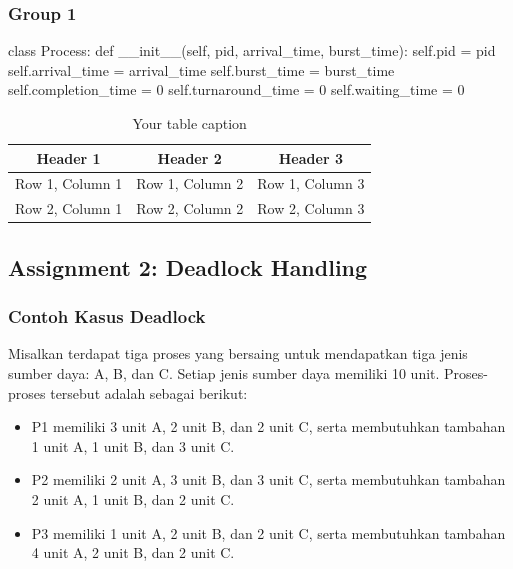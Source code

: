 \documentclass[12pt]{article}
\begin{document}
\subsubsection{Group 1}
\begin{python}
    class Process:
    def __init__(self, pid, arrival_time, burst_time):
        self.pid = pid
        self.arrival_time = arrival_time
        self.burst_time = burst_time
        self.completion_time = 0
        self.turnaround_time = 0
        self.waiting_time = 0
\end{python}

\begin{table}[htbp] %
    \centering
    \begin{tabular}{|c|c|c|} %
    \hline
    Header 1 & Header 2 & Header 3 \\ %
    \hline
    Row 1, Column 1 & Row 1, Column 2 & Row 1, Column 3 \\ %
    \hline
    Row 2, Column 1 & Row 2, Column 2 & Row 2, Column 3 \\ %
    \hline
    \end{tabular}
    \caption{Your table caption} %
    \label{tab:your_label} %
\end{table}
 
\subsection{Assignment 2: Deadlock Handling}
\subsubsection{Contoh Kasus Deadlock}
Misalkan terdapat tiga proses yang bersaing untuk mendapatkan tiga jenis sumber daya: A, B, dan C. Setiap jenis sumber daya memiliki 10 unit. Proses-proses tersebut adalah sebagai berikut:

\begin{itemize}
    \item P1 memiliki 3 unit A, 2 unit B, dan 2 unit C, serta membutuhkan tambahan 1 unit A, 1 unit B, dan 3 unit C.
    \item P2 memiliki 2 unit A, 3 unit B, dan 3 unit C, serta membutuhkan tambahan 2 unit A, 1 unit B, dan 2 unit C.
    \item P3 memiliki 1 unit A, 2 unit B, dan 2 unit C, serta membutuhkan tambahan 4 unit A, 2 unit B, dan 2 unit C.
\end{itemize}
\end{document}
